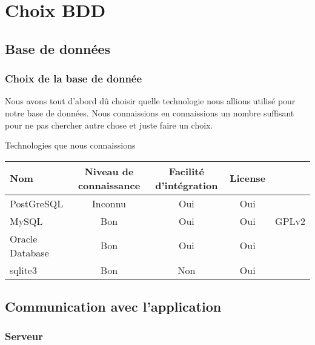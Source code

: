 \documentclass[a4paper, 11pt]{report}
\begin{document}
\chapter{Choix BDD}
\section{Base de données}
\subsection{Choix de la base de donnée}
	Nous avons tout d'abord dû choisir quelle technologie nous allions utilisé pour notre base de données.
	Nous connaissions en connaissions un nombre suffisant pour ne pas chercher autre chose et juste faire un choix.
	\par
	\begin{center}
		Technologies que nous connaissions
		\par
		\begin{tabular}{|l|c|c|c|c|}
			\hline
			Nom & Niveau de connaissance & Facilité d'intégration & License \\
			\hline
			PostGreSQL & Inconnu & Oui & Oui\\
			\hline
			MySQL & Bon & Oui & Oui & GPLv2\\
			\hline
			Oracle Database & Bon & Oui & Oui \\
			\hline
			sqlite3 & Bon & Non & Oui \\
			\hline
		\end{tabular}
	\end{center}
\section{Communication avec l'application}
\subsection{Serveur}
\end{document}
